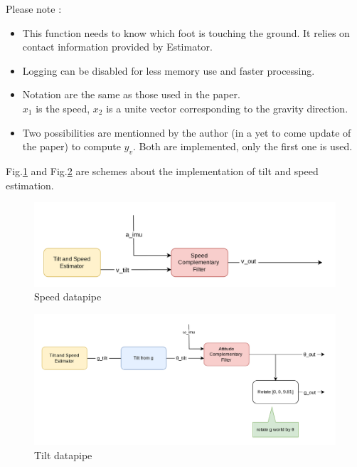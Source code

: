 \documentclass[a4paper,10pt]{article}
\begin{document}
Please note :\\

\begin{itemize}[noitemsep,topsep=0.5pt,parsep=0.1pt,partopsep=0.1pt]
	\item{This function needs to know which foot is touching the ground. It relies on contact information provided by Estimator.}
	\item{Logging can be disabled for less memory use and faster processing.}
	\item{Notation are the same as those used in the paper.\\ $x_1$ is the speed, $x_2$ is a unite vector corresponding to the gravity direction.}
	\item{Two possibilities are mentionned by the author (in a yet to come update of the paper) to compute $y_v$. Both are implemented, only the first one is used.}
	
\end{itemize}

Fig.\ref{fig:speed_datapipe} and Fig.\ref{fig:tilt_datapipe} are schemes about the implementation of tilt and speed estimation.

\begin{figure}[H]
\label{fig:speed_datapipe}
\centering
  \includegraphics[width=0.9\linewidth]{./images/Variable_Speed.png}
  \caption{Speed datapipe}
  \label{fig:speed_datapipe}
\end{figure}

\begin{figure}[H]
\label{fig:tilt_datapipe}
\centering
  \includegraphics[width=\linewidth]{./images/Variable_Attitude.png}
  \caption{Tilt datapipe}
  \label{fig:tilt_datapipe}
\end{figure}
\end{document}
